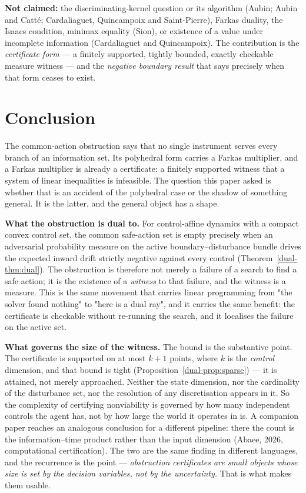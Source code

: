 \documentclass[10pt,twocolumn]{article}
\theoremstyle{plain}
\theoremstyle{definition}
\theoremstyle{remark}
\begin{document}
\noindent \textbf{Not claimed:} the discriminating-kernel question or its algorithm (Aubin;
Aubin and Catt\'e; Cardaliaguet, Quincampoix and Saint-Pierre), Farkas duality, the Isaacs
condition, minimax equality (Sion), or existence of a value under incomplete information
(Cardaliaguet and Quincampoix). The contribution is the \emph{certificate form} --- a
finitely supported, tightly bounded, exactly checkable measure witness --- and the
\emph{negative boundary result} that says precisely when that form ceases to exist.

\section{Conclusion}
\label{dual-conclusion}

The common-action obstruction says that no single instrument serves every branch of an
information set. Its polyhedral form carries a Farkas multiplier, and a Farkas multiplier is
already a certificate: a finitely supported witness that a system of linear inequalities is
infeasible. The question this paper asked is whether that is an accident of the polyhedral
case or the shadow of something general. It is the latter, and the general object has a
shape.

\textbf{What the obstruction is dual to.} For control-affine dynamics with a compact convex
control set, the common safe-action set is empty precisely when an adversarial probability
measure on the active boundary--disturbance bundle drives the expected inward drift strictly
negative against every control (Theorem~\ref{dual-thm:dual}). The obstruction is therefore not
merely a failure of a search to find a safe action; it is the existence of a \emph{witness} to
that failure, and the witness is a measure. This is the same movement that carries linear
programming from "the solver found nothing" to "here is a dual ray", and it carries the same
benefit: the certificate is checkable without re-running the search, and it localises the
failure on the active set.

\textbf{What governs the size of the witness.} The bound is the substantive point. The
certificate is supported on at most \(k + 1\) points, where \(k\) is the \emph{control}
dimension, and that bound is tight (Proposition~\ref{dual-prop:sparse}) --- it is attained, not
merely approached. Neither the state dimension, nor the cardinality of the disturbance set,
nor the resolution of any discretisation appears in it. So the complexity of certifying
nonviability is governed by how many independent controls the agent has, not by how large the
world it operates in is. A companion paper reaches an analogous conclusion for a different
pipeline: there the count is the information--time product rather than the input dimension
(Abaee, 2026, computational certification). The two are the same finding in different
languages, and the recurrence is the point --- \emph{obstruction certificates are small
objects whose size is set by the decision variables, not by the uncertainty.} That is what
makes them usable.
\end{document}
